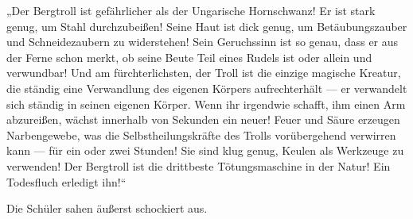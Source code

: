 „Der Bergtroll ist gefährlicher als der Ungarische Hornschwanz! Er ist stark genug, um Stahl durchzubeißen! Seine Haut ist dick genug, um Betäubungszauber und Schneidezaubern zu widerstehen! Sein Geruchssinn ist so genau, dass er aus der Ferne schon merkt, ob seine Beute Teil eines Rudels ist oder allein und verwundbar! Und am fürchterlichsten, der Troll ist die einzige magische Kreatur, die ständig eine Verwandlung des eigenen Körpers aufrechterhält — er verwandelt sich ständig in seinen eigenen Körper. Wenn ihr irgendwie schafft, ihm einen Arm abzureißen, wächst innerhalb von Sekunden ein neuer! Feuer und Säure erzeugen Narbengewebe, was die Selbstheilungskräfte des Trolls vorübergehend verwirren kann — für ein oder zwei Stunden! Sie sind klug genug, Keulen als Werkzeuge zu verwenden! Der Bergtroll ist die drittbeste Tötungsmaschine in der Natur! Ein Todesfluch erledigt ihn!“

Die Schüler sahen äußerst schockiert aus.


